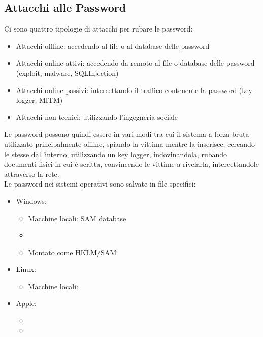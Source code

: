 \subsection{Attacchi alle Password}
Ci sono quattro tipologie di attacchi per rubare le password:
\begin{itemize}[noitemsep]
    \item Attacchi offline: accedendo al file o al database delle password
    \item Attacchi online attivi: accedendo da remoto al file o database delle password (exploit, malware, SQLInjection)
    \item Attacchi online passivi: intercettando il traffico contenente la password (key logger, \acrfull{MITM})
    \item Attacchi non tecnici: utilizzando l'ingegneria sociale
\end{itemize}
Le password possono quindi essere  in vari modi tra cui il sistema a forza bruta utilizzato principalmente offline, spiando la vittima mentre la inserisce, cercando le stesse dall'interno, utilizzando un key logger, indovinandola, rubando documenti fisici in cui è scritta, convincendo le vittime a rivelarla, intercettandole attraverso la rete.\\
Le password nei sistemi operativi sono salvate in file specifici:
\begin{itemize}[noitemsep]
    \item Windows:
    \begin{itemize}[noitemsep]
        \item Macchine locali: SAM database
        \item {}
        \item Montato come HKLM/SAM
    \end{itemize}
    \item Linux:
    \begin{itemize}[noitemsep]
        \item Macchine locali: 
    \end{itemize}
    \item Apple:
    \begin{itemize}[noitemsep]
        \item {}
        \item {}
    \end{itemize}
\end{itemize}
